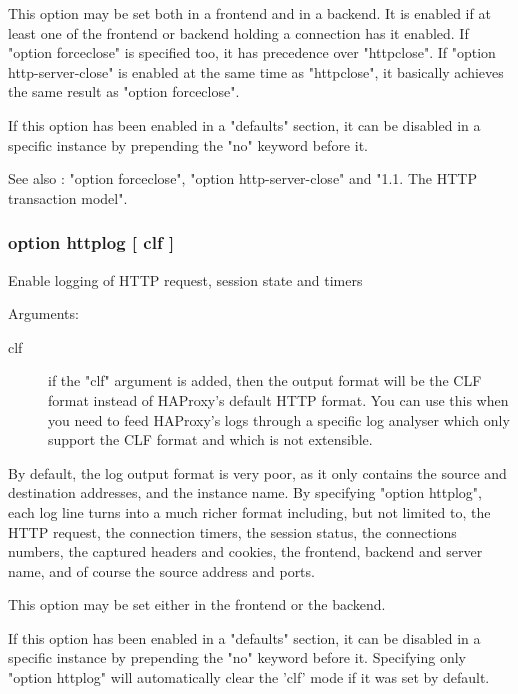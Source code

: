   This option may be set both in a frontend and in a backend. It is enabled if
  at least one of the frontend or backend holding a connection has it enabled.
  If "option forceclose" is specified too, it has precedence over "httpclose".
  If "option http-server-close" is enabled at the same time as "httpclose", it
  basically achieves the same result as "option forceclose".

  If this option has been enabled in a "defaults" section, it can be disabled
  in a specific instance by prepending the "no" keyword before it.

  See also : "option forceclose", "option http-server-close" and
             "1.1. The HTTP transaction model".

\subsubsection[option httplog]{option httplog [ clf ]}


  Enable logging of HTTP request, session state and timers


  Arguments:
  
\begin{description}
\item[clf]       if the "clf" argument is added, then the output format will be
              the CLF format instead of HAProxy's default HTTP format. You can
              use this when you need to feed HAProxy's logs through a specific
              log analyser which only support the CLF format and which is not
              extensible.
\end{description}

  By default, the log output format is very poor, as it only contains the
  source and destination addresses, and the instance name. By specifying
  "option httplog", each log line turns into a much richer format including,
  but not limited to, the HTTP request, the connection timers, the session
  status, the connections numbers, the captured headers and cookies, the
  frontend, backend and server name, and of course the source address and
  ports.

  This option may be set either in the frontend or the backend.

  If this option has been enabled in a "defaults" section, it can be disabled
  in a specific instance by prepending the "no" keyword before it. Specifying
  only "option httplog" will automatically clear the 'clf' mode if it was set
  by default.

